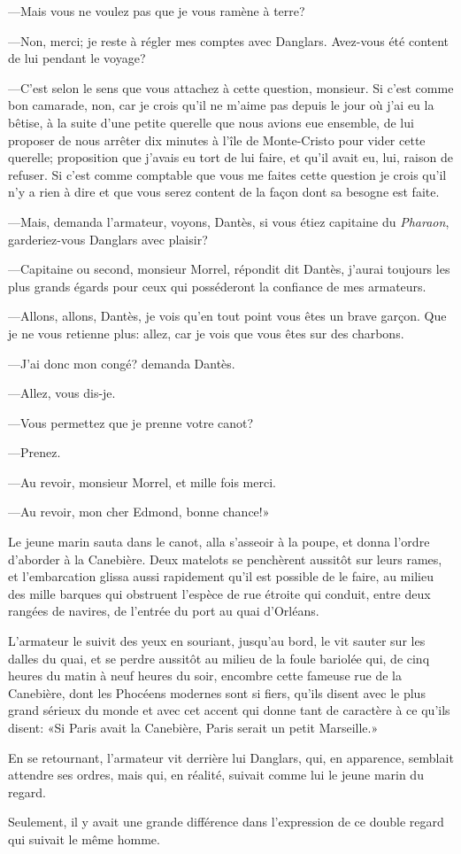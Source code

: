 —Mais vous ne voulez pas que je vous ramène à terre?

—Non, merci; je reste à régler mes comptes avec Danglars. Avez-vous été content de lui pendant le voyage?

—C'est selon le sens que vous attachez à cette question, monsieur. Si c'est comme bon camarade, non, car je crois qu'il ne m'aime pas depuis le jour où j'ai eu la bêtise, à la suite d'une petite querelle que nous avions eue ensemble, de lui proposer de nous arrêter dix minutes à l'île de Monte-Cristo pour vider cette querelle; proposition que j'avais eu tort de lui faire, et qu'il avait eu, lui, raison de refuser. Si c'est comme comptable que vous me faites cette question je crois qu'il n'y a rien à dire et que vous serez content de la façon dont sa besogne est faite.

—Mais, demanda l'armateur, voyons, Dantès, si vous étiez capitaine du \textit{Pharaon}, garderiez-vous Danglars avec plaisir?

—Capitaine ou second, monsieur Morrel, répondit dit Dantès, j'aurai toujours les plus grands égards pour ceux qui posséderont la confiance de mes armateurs.

—Allons, allons, Dantès, je vois qu'en tout point vous êtes un brave garçon. Que je ne vous retienne plus: allez, car je vois que vous êtes sur des charbons.

—J'ai donc mon congé? demanda Dantès.

—Allez, vous dis-je.

—Vous permettez que je prenne votre canot?

—Prenez.

—Au revoir, monsieur Morrel, et mille fois merci.

—Au revoir, mon cher Edmond, bonne chance!»

Le jeune marin sauta dans le canot, alla s'asseoir à la poupe, et donna l'ordre d'aborder à la Canebière. Deux matelots se penchèrent aussitôt sur leurs rames, et l'embarcation glissa aussi rapidement qu'il est possible de le faire, au milieu des mille barques qui obstruent l'espèce de rue étroite qui conduit, entre deux rangées de navires, de l'entrée du port au quai d'Orléans.

L'armateur le suivit des yeux en souriant, jusqu'au bord, le vit sauter sur les dalles du quai, et se perdre aussitôt au milieu de la foule bariolée qui, de cinq heures du matin à neuf heures du soir, encombre cette fameuse rue de la Canebière, dont les Phocéens modernes sont si fiers, qu'ils disent avec le plus grand sérieux du monde et avec cet accent qui donne tant de caractère à ce qu'ils disent: «Si Paris avait la Canebière, Paris serait un petit Marseille.»

En se retournant, l'armateur vit derrière lui Danglars, qui, en apparence, semblait attendre ses ordres, mais qui, en réalité, suivait comme lui le jeune marin du regard.

Seulement, il y avait une grande différence dans l'expression de ce double regard qui suivait le même homme.



